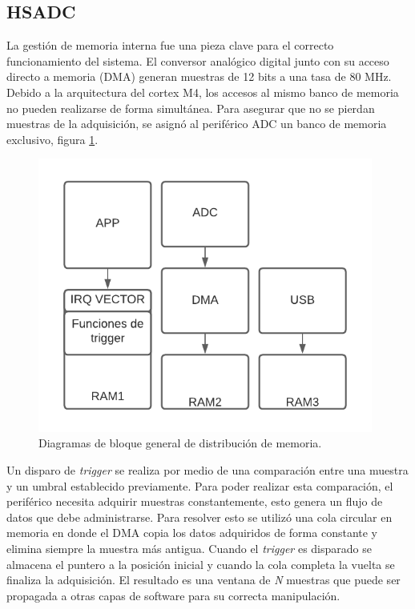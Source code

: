 \newpage

\subsection{HSADC}

La gestión de memoria interna fue una pieza clave para el correcto funcionamiento del sistema. El conversor analógico digital junto con su acceso directo a memoria (DMA) generan muestras de 12 bits a una tasa de 80 MHz. Debido a la arquitectura del cortex M4, los accesos al mismo banco de memoria no pueden realizarse de forma simultánea. Para asegurar que no se pierdan muestras de la adquisición, se asignó al periférico ADC un banco de memoria exclusivo, figura \ref{fig:firmMemoria}.

\begin{figure}[ht]
	\centering
	\includegraphics[width=110mm]{./Figures/firmMemoria.png}
	\caption{Diagramas de bloque general de distribución de memoria.}
	\label{fig:firmMemoria}
\end{figure}

Un disparo de \textit{trigger} se realiza por medio de una comparación entre una muestra y un umbral establecido previamente. Para poder realizar esta comparación, el periférico necesita adquirir muestras constantemente, esto genera un flujo de datos que debe administrarse. Para resolver esto se utilizó una cola circular en memoria en donde el DMA copia los datos adquiridos de forma constante y elimina siempre la muestra más antigua. Cuando el \textit{trigger} es disparado se almacena el puntero a la posición inicial y cuando la cola completa la vuelta se finaliza la adquisición. El resultado es una ventana de \textit{N} muestras que puede ser propagada a otras capas de software para su correcta manipulación. 

